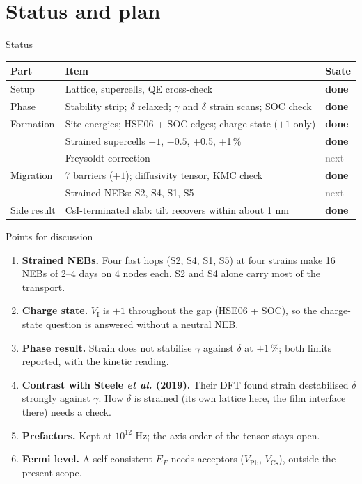 \documentclass[aspectratio=169,10pt]{beamer}
\newcommand{\done}{\textcolor{cs}{\textbf{done}}}
\newcommand{\nxt}{\textcolor{gray}{next}}
\begin{document}
\section{Status and plan}

\begin{frame}{Status}
  \footnotesize
  \begin{tabular}{lll}
    \toprule
    Part & Item & State \\
    \midrule
    Setup & Lattice, supercells, QE cross-check & \done \\
    Phase & Stability strip; $\delta$ relaxed; $\gamma$ and $\delta$ strain scans; SOC check & \done \\
    Formation & Site energies; HSE06 + SOC edges; charge state ($+1$ only) & \done \\
    & Strained supercells $-1$, $-0.5$, +0.5, +1\,\% & \done \\
    & Freysoldt correction & \nxt \\
    Migration & 7 barriers ($+1$); diffusivity tensor, KMC check & \done \\
    & Strained NEBs: S2, S4, S1, S5 & \nxt \\
    Side result & CsI-terminated slab: tilt recovers within about 1 nm & \done \\
    \bottomrule
  \end{tabular}
\end{frame}

\begin{frame}{Points for discussion}
  \small
  \begin{enumerate}
    \item \textbf{Strained NEBs.} Four fast hops (S2, S4, S1, S5) at four strains make 16 NEBs of 2--4 days on 4 nodes each. S2 and S4 alone carry most of the transport.
    \item \textbf{Charge state.} $V_\mathrm{I}$ is $+1$ throughout the gap (HSE06 + SOC), so the charge-state question is answered without a neutral NEB.
    \item \textbf{Phase result.} Strain does not stabilise $\gamma$ against $\delta$ at $\pm$1\,\%; both limits reported, with the kinetic reading.
    \item \textbf{Contrast with Steele \emph{et al.} (2019).} Their DFT found strain destabilised $\delta$ strongly against $\gamma$. How $\delta$ is strained (its own lattice here, the film interface there) needs a check.
    \item \textbf{Prefactors.} Kept at $10^{12}$ Hz; the axis order of the tensor stays open.
    \item \textbf{Fermi level.} A self-consistent $E_F$ needs acceptors ($V_\mathrm{Pb}$, $V_\mathrm{Cs}$), outside the present scope.
  \end{enumerate}
\end{frame}
\end{document}
